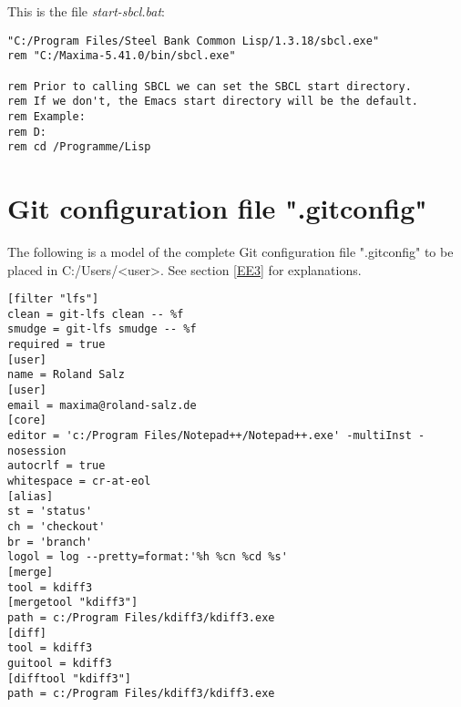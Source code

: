 \documentclass[../Maxima_Workbook.tex]{subfiles}
\begin{document}
\lzzz This is the file \emph{start-sbcl.bat}:

\begin{lstlisting}[style=smallblue]
"C:/Program Files/Steel Bank Common Lisp/1.3.18/sbcl.exe"
rem "C:/Maxima-5.41.0/bin/sbcl.exe"

rem Prior to calling SBCL we can set the SBCL start directory.
rem If we don't, the Emacs start directory will be the default.
rem Example:
rem D:
rem cd /Programme/Lisp
\end{lstlisting}

\chapter{Git configuration file ".gitconfig"}\label{AA3}

The following is a model of the complete Git configuration file ".gitconfig" to be placed in C:/Users/<user>. See section \ref{EE3} for explanations.

\begin{lstlisting}[style=smallblue]
[filter "lfs"]
clean = git-lfs clean -- %f
smudge = git-lfs smudge -- %f
required = true
[user]
name = Roland Salz
[user]
email = maxima@roland-salz.de
[core]
editor = 'c:/Program Files/Notepad++/Notepad++.exe' -multiInst -nosession
autocrlf = true
whitespace = cr-at-eol
[alias]
st = 'status'
ch = 'checkout'
br = 'branch'
logol = log --pretty=format:'%h %cn %cd %s'
[merge]
tool = kdiff3
[mergetool "kdiff3"]
path = c:/Program Files/kdiff3/kdiff3.exe
[diff]
tool = kdiff3
guitool = kdiff3
[difftool "kdiff3"]
path = c:/Program Files/kdiff3/kdiff3.exe
\end{lstlisting}
\end{document}
